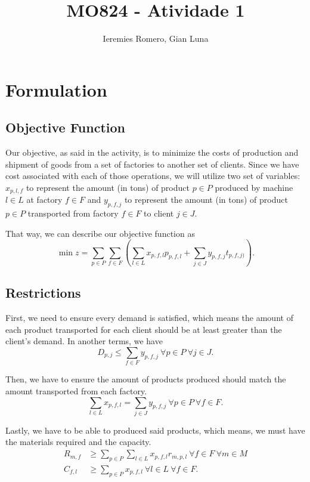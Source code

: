 \documentclass[11pt]{article}
\author{Ieremies Romero, Gian Luna}
\date{}
\title{MO824 - Atividade 1}
\theoremstyle{definition}
\theoremstyle{definition}
\theoremstyle{remark}
\theoremstyle{remark}
\theoremstyle{remark}
\theoremstyle{remark}
\theoremstyle{definition}
\begin{document}
\maketitle

\section*{Formulation}
\label{sec:org4ccb63a}
\subsection*{Objective Function}
\label{sec:orgf9d4fa4}
Our objective, as said in the activity, is to minimize the costs of production and shipment of goods from a set of factories to another set of clients. Since we have cost associated with each of those operations, we will utilize two set of variables: \(x_{p,l,f}\) to represent the amount (in tons) of product \(p \in P\) produced by machine \(l \in L\) at factory \(f \in F\) and \(y_{p, f, j}\) to represent the amount (in tons) of product \(p \in P\) transported from factory \(f \in F\) to client \(j \in J\).

That way, we can describe our objective function as
\[ \min z = \sum \limits_{p \in P} \sum_{f \in F} (\sum \limits_{l \in L} x_{p,f,l}p_{p,f,l} + \sum_{j \in J} y_{p,f,j}t_{p,f,j)}). \]
\subsection*{Restrictions}
\label{sec:org950ef31}
First, we need to ensure every demand is satisfied, which means the amount of each product transported for each client should be at least greater than the client's demand. In another terms, we have
\[ D_{p,j} \leq \sum_{f \in F} y_{p,f,j} \ \forall p \in P \ \forall j \in J. \]

Then, we have to ensure the amount of products produced should match the amount transported from each factory.
\[ \sum \limits_{l \in L} x_{p,f,l} = \sum_{j \in J} y_{p,f,j} \ \forall p \in P \ \forall f \in F . \]

Lastly, we have to be able to produced said products, which means, we must have the materials required and the capacity.
\begin{align*}
R_{m,f} &\geq \sum \limits_{p \in P} \sum \limits_{l \in L} x_{p,f,l}r_{m,p,l} \ \forall f \in F \ \forall m \in M \\
C_{f,l} &\geq \sum_{p \in P} x_{p,f,l} \ \forall l \in L \ \forall f \in F.
\end{align*}
\end{document}
